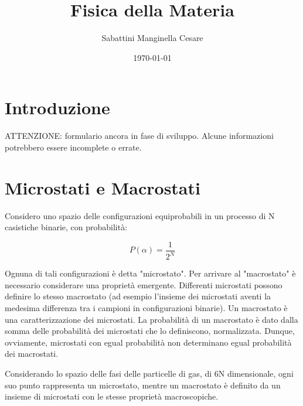 \documentclass{article}
\title{Fisica della Materia}
\author{Sabattini Manginella Cesare}
\date{\today}
\begin{document}
\maketitle

\section{Introduzione}
ATTENZIONE: formulario ancora in fase di sviluppo. Alcune informazioni potrebbero essere incomplete o errate.

\section{Microstati e Macrostati}
Considero uno spazio delle configurazioni equiprobabili in un processo di N casistiche binarie, con probabilità:

\begin{equation}
    P(\alpha) = \frac{1}{2^N}
\end{equation}

Ognuna di tali configurazioni è detta "microstato".
Per arrivare al "macrostato" è necessario considerare una proprietà emergente.
Differenti microstati possono definire lo stesso macrostato (ad esempio l'insieme dei microstati aventi la medesima differenza tra i campioni in configurazioni binarie).
Un macrostato è una caratterizzazione dei microstati.
La probabilità di un macrostato è dato dalla somma delle probabilità dei microstati che lo definiscono, normalizzata.
Dunque, ovviamente, microstati con egual probabilità non determinano egual probabilità dei macrostati.

Considerando lo spazio delle fasi delle particelle di gas, di 6N dimensionale, ogni suo punto rappresenta un microstato, mentre un macrostato è definito da un insieme di microstati con le stesse proprietà macroscopiche.
\end{document}
